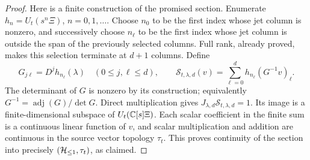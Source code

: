 \begin{proof}
Here is a finite construction of the promised section. Enumerate
$h_n=U_t(s^n\Xi)$, $n=0,1,\ldots$. Choose $n_0$ to be
the first index whose jet column is nonzero, and successively
choose $n_\ell$ to be the first index whose jet column is
outside the span of the previously selected columns.
Full rank, already proved, makes this selection terminate
at $d+1$ columns. Define
\begin{equation}
 G_{j\ell}=D^jh_{n_\ell}(\lambda)
 \quad(0\le j,\ell\le d),\qquad
 \mathcal S_{t,\lambda,d}(v)
   =\sum_{\ell=0}^d h_{n_\ell}(G^{-1}v)_\ell.
 \label{eq:cq-moving-jet-finite-section}
\end{equation}
The determinant of $G$ is nonzero by its construction;
equivalently $G^{-1}=\operatorname{adj}(G)/\det G$.
Direct multiplication gives
$J_{\lambda,d}\mathcal S_{t,\lambda,d}=1$.
Its image is a finite-dimensional subspace of
$U_t(\mathbb C[s]\Xi)$. Each scalar coefficient in the finite
sum is a continuous linear function of $v$, and scalar
multiplication and addition are continuous in the source
vector topology $\tau_t$. This proves continuity of the
section into precisely $(\mathcal H_{\leq 1},\tau_t)$, as claimed.
\end{proof}

